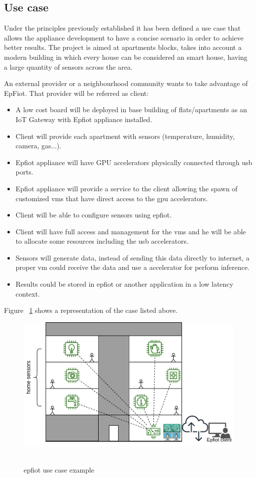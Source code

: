 \subsection{Use case}
\label{makereference1.2.1}
Under the principles previously established it has been defined a use case that allows the appliance development to have a concise scenario in order to achieve better results. The project is aimed at apartments blocks, takes into account a modern building in which every house can be considered an smart house, having a large quantity of sensors across the area.

An external provider or a neighbourhood community wants to take advantage of EpFiot. That provider will be referred as client:
\begin{itemize}
  \item A low cost board will be deployed in base building of flats/apartments as an IoT Gateway with Epfiot appliance installed.
  \item Client will provide each apartment with sensors (temperature, humidity, camera, gas...).
  \item Epfiot appliance will have GPU accelerators physically connected through usb ports.
  \item Epfiot appliance will provide a service to the client allowing the spawn of customized vms that have direct access to the gpu accelerators.
  \item Client will be able to configure sensors using epfiot.
  \item Client will have full access and management for the vms and he will be able to allocate some resources including the usb accelerators.
  \item Sensors will generate data, instead of sending this data directly to internet, a proper vm could receive the data and use a accelerator for perform inference.
  \item Results could be stored in epfiot or another application in a low latency context.
\end{itemize}

Figure ~\ref{figure1.2} shows a representation of the case listed above.

\begin{figure}[h]%
    \includegraphics[width=6.5in]{figures/use_case.png}
~\caption{epfiot use case example}
\label{figure1.2}
\end{figure}

